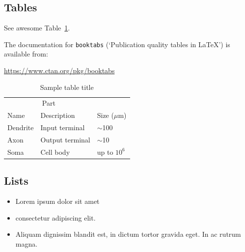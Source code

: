 \documentclass{article}
\begin{document}
\subsection{Tables}
See awesome Table~\ref{tab:table}.

The documentation for \verb+booktabs+ (`Publication quality tables in LaTeX') is available from:
\begin{center}
	\url{https://www.ctan.org/pkg/booktabs}
\end{center}


\begin{table}
	\caption{Sample table title}
	\centering
	\begin{tabular}{lll}
		\toprule
		\multicolumn{2}{c}{Part}                   \\
		\cmidrule(r){1-2}
		Name     & Description     & Size ($\mu$m) \\
		\midrule
		Dendrite & Input terminal  & $\sim$100     \\
		Axon     & Output terminal & $\sim$10      \\
		Soma     & Cell body       & up to $10^6$  \\
		\bottomrule
	\end{tabular}
	\label{tab:table}
\end{table}

\subsection{Lists}
\begin{itemize}
	\item Lorem ipsum dolor sit amet
	\item consectetur adipiscing elit.
	\item Aliquam dignissim blandit est, in dictum tortor gravida eget. In ac rutrum magna.
\end{itemize}


% 
% 
\end{document}
